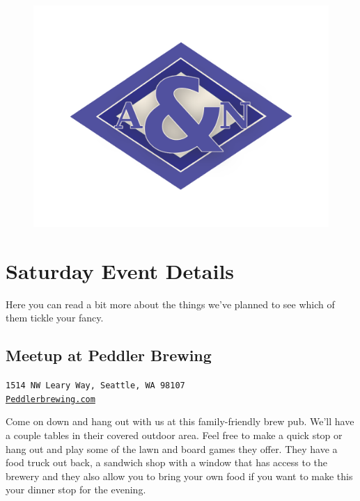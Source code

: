 \documentclass[12pt]{article}
\begin{document}
\vspace{0.5in}
\begin{figure}[h]
    \centering
    \includegraphics[width=\textwidth]{logo-navy-80}
\end{figure}

\newpage

\section{Saturday Event Details}
Here you can read a bit more about the things we've planned to see which of them tickle your fancy.

\subsection{Meetup at Peddler Brewing}
\label{subsec-dinner-sat}
\begin{center}
    \texttt{1514 NW Leary Way, Seattle, WA 98107\\\href{Peddlerbrewing.com}{Peddlerbrewing.com}}
\end{center}

    Come on down and hang out with us at this family-friendly brew pub. We'll have a couple tables 
    in their covered outdoor area. Feel free to make a quick stop or hang out and play some of the 
    lawn and board games they offer. They have a food truck out back, a sandwich shop with a window 
    that has access to the brewery and they also allow you to bring your own food if you want to make 
    this your dinner stop for the evening. 
\end{document}
